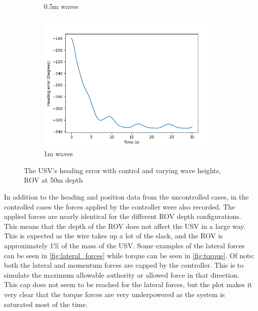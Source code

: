 \documentclass[class=article, crop=false]{standalone}
\begin{document}
\begin{figure}
\begin{subfigure}{0.65\textwidth}
        \caption{0.5m waves}
    \end{subfigure}
    \vfill
    \begin{subfigure}{0.65\textwidth}
        \centering
        \includegraphics{scenario1/rov-50m/1.0m/usv_heading_error_controlled}
        \caption{1m waves}
        \label{fig:position_controlled_1m}
    \end{subfigure}
    \vfill
    \caption{The USV's heading error with control and varying wave heights, ROV at 50m depth}
    \label{fig:heading_error_controlled}
\end{figure}

In addition to the heading and position data from the uncontrolled cases, in the controlled cases the forces applied by the controller were also recorded. The applied forces are nearly identical for the different ROV depth configurations. This means that the depth of the ROV does not affect the USV in a large way. This is expected as the wire takes up a lot of the slack, and the ROV is approximately 1\% of the mass of the USV. Some examples of the lateral forces can be seen in \cref{fig:lateral_forces} while torque can be seen in \cref{fig:torque}. Of note: both the lateral and momentum forces are capped by the controller. This is to simulate the maximum allowable authority or allowed force in that direction. This cap does not seem to be reached for the lateral forces, but the plot makes it very clear that the torque forces are very underpowered as the system is saturated most of the time.
\end{document}
